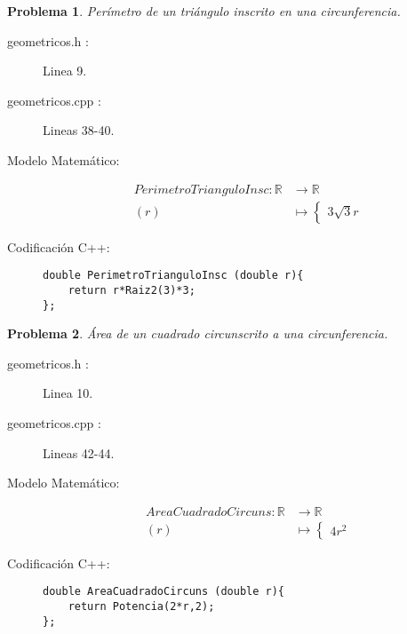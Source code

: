 \documentclass{article}
\theoremstyle{plain}
\theoremstyle{definition}
\newtheorem{problem}{Problema}
\begin{document}
\begin{problem} \emph{Perímetro de un triángulo inscrito en una circunferencia.}\\
\begin{description}
\item[geometricos.h :] Linea 9. \item[geometricos.cpp :] Lineas 38-40.

\item[Modelo Matemático:]
\begin{align*}
PerimetroTrianguloInsc: \mathbb{R} &\to \mathbb{R}\\
(r) &\mapsto \begin{cases}
3\sqrt{3}r
\end{cases}
\end{align*}
%
\item[Codificación \textsf{C++}:]\hfill
%
\begin{verbatim}
double PerimetroTrianguloInsc (double r){
    return r*Raiz2(3)*3;
};
\end{verbatim}
\end{description}
\end{problem}

\begin{problem} \emph{Área de un cuadrado circunscrito a una circunferencia.}\\
\begin{description}
\item[geometricos.h :] Linea 10. \item[geometricos.cpp :] Lineas 42-44.

\item[Modelo Matemático:]
\begin{align*}
AreaCuadradoCircuns: \mathbb{R} &\to \mathbb{R}\\
(r) &\mapsto \begin{cases}
4r^{2}
\end{cases}
\end{align*}
%
\item[Codificación \textsf{C++}:]\hfill
%
\begin{verbatim}
double AreaCuadradoCircuns (double r){
    return Potencia(2*r,2);
};
\end{verbatim}
\end{description}
\end{problem}
\end{document}
